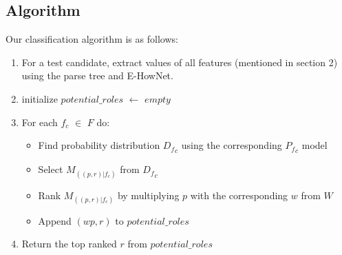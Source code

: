 \subsection{Algorithm}
Our classification algorithm is as follows:
\begin{enumerate}
\item For a test candidate, extract values of all features (mentioned in section 2) using the parse tree and E-HowNet.
\item initialize $potential\_roles$  $\leftarrow$ $empty$ 
\item For each $f_c$  $\in$ $F$ do:
\begin{itemize}
 \item Find probability distribution ${D_f}_c$ using the corresponding ${P_f}_c$ model
 \item Select $M_{((p,r)|f_c)}$ from ${D_f}_c$
 \item Rank $M_{((p,r)|f_c)}$ by multiplying $p$ with the corresponding $w$ from $W$
 \item Append $(wp,r)$ to $potential\_roles$
 \end{itemize}
\item Return the top ranked $r$ from $potential\_roles$
 \end{enumerate}
